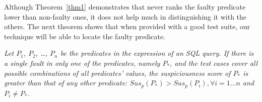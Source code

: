 


Although Theorem~\ref{thm1} demonstrates that \tool{} never ranks the
faulty predicate lower than non-faulty ones, it does not help much in
distinguishing it with the others. The next theorem shows that when
provided with a good test suite, our technique will be able to locate
the faulty predicate.

\begin{theorem}
\label{thm2}
{\em Let $P_1$, $P_2$, \ldots, $P_n$ be the predicates in the 
expression of an SQL query. If there is a single fault in only one of
the predicates, namely $P_*$, and the test cases cover all possible
combinations of all predicates' values, the suspiciousness score of
$P_*$ is greater than that of any other predicate: $Sus_p(P_*) >
Sus_p(P_i), \forall i = 1 \ldots n$ and $P_i \neq P_*$.}
\end{theorem}

